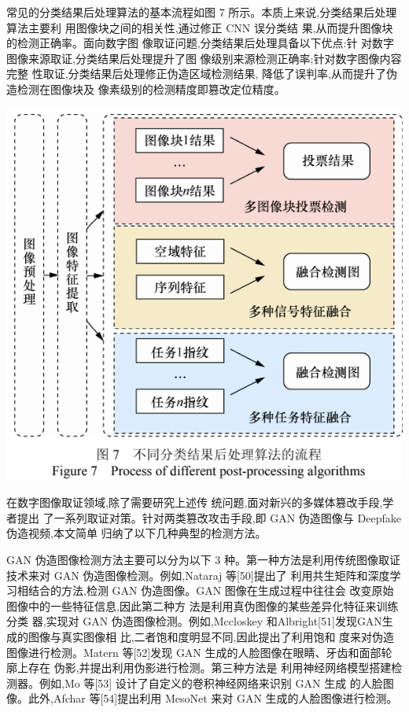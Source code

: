 \documentclass{article}
\begin{document}
常见的分类结果后处理算法的基本流程如图 7 所示。本质上来说,分类结果后处理算法主要利 用图像块之间的相关性,通过修正 CNN 误分类结 果,从而提升图像块的检测正确率。面向数字图 像取证问题,分类结果后处理具备以下优点:针 对数字图像来源取证,分类结果后处理提升了图 像级别来源检测正确率;针对数字图像内容完整 性取证,分类结果后处理修正伪造区域检测结果, 降低了误判率,从而提升了伪造检测在图像块及 像素级别的检测精度即篡改定位精度。


\includegraphics{_page_7_Figure_8.png}


在数字图像取证领域,除了需要研究上述传 统问题,面对新兴的多媒体篡改手段,学者提出 了一系列取证对策。针对两类篡改攻击手段,即 GAN 伪造图像与 Deepfake 伪造视频,本文简单 归纳了以下几种典型的检测方法。

GAN 伪造图像检测方法主要可以分为以下 3 种。第一种方法是利用传统图像取证技术来对 GAN 伪造图像检测。例如,Nataraj 等[50]提出了 利用共生矩阵和深度学习相结合的方法,检测 GAN 伪造图像。GAN 图像在生成过程中往往会 改变原始图像中的一些特征信息,因此第二种方 法是利用真伪图像的某些差异化特征来训练分类 器,实现对 GAN 伪造图像检测。例如,Mccloskey 和Albright[51]发现GAN生成的图像与真实图像相 比,二者饱和度明显不同,因此提出了利用饱和 度来对伪造图像进行检测。Matern 等[52]发现 GAN 生成的人脸图像在眼睛、牙齿和面部轮廓上存在 伪影,并提出利用伪影进行检测。第三种方法是 利用神经网络模型搭建检测器。例如,Mo 等[53] 设计了自定义的卷积神经网络来识别 GAN 生成 的人脸图像。此外,Afchar 等[54]提出利用 MesoNet 来对 GAN 生成的人脸图像进行检测。
\end{document}
